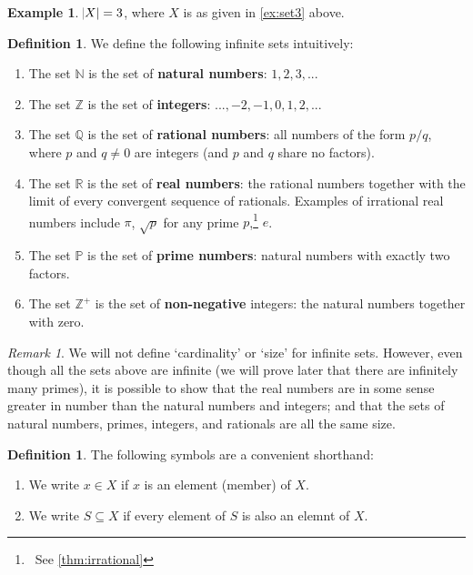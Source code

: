 \documentclass[a4paper]{amsart}
\theoremstyle{definition}
\newtheorem{defn}[thm]{Definition}
\newtheorem{ex}[thm]{Example}
\theoremstyle{remark}
\newtheorem{rem}[thm]{Remark}
\begin{document}
\begin{ex}
  $ \abs{X} = 3 $, where $ X $ is as given in \cref{ex:set3} above.
\end{ex}

\begin{defn}
  We define the following infinite sets intuitively:
  \begin{enumerate}
    \item The set $ \mathbb{N} $ is the set of \textbf{natural numbers}: $ 1, 2, 3, ... $
    \item The set $ \mathbb{Z} $ is the set of \textbf{integers}: $ ..., -2, -1, 0, 1, 2, ... $
    \item The set $ \mathbb{Q} $ is the set of \textbf{rational numbers}: all numbers of the form $ p/q $, where $ p $ and $ q \neq 0 $ are
          integers (and $ p $ and $ q $ share no factors).
    \item The set $ \mathbb{R} $ is the set of \textbf{real numbers}: the rational numbers together with the limit of every convergent
          sequence of rationals. Examples of irrational real numbers include $ \pi $, $ \sqrt{p} $ for any
          prime $ p $,\footnote{~See \cref{thm:irrational}} $ e $.
    \item The set $ \mathbb{P} $ is the set of \textbf{prime numbers}: natural numbers with exactly two factors.
    \item The set $ \mathbb{Z}^+ $ is the set of \textbf{non-negative} integers: the natural numbers together with zero.
  \end{enumerate}
\end{defn}

\begin{rem}
  We will not define `cardinality' or `size' for infinite sets. However, even though all the sets above are infinite (we will prove
  later that there are infinitely many primes), it is possible to show that the real numbers are in some sense greater in number
  than the natural numbers and integers; and that the sets of natural numbers, primes, integers, and rationals are all the same size.
\end{rem}

\begin{defn}
  The following symbols are a convenient shorthand:

  \begin{enumerate}
    \item We write $ x \in X $ if $ x $ is an element (member) of $ X $.
    \item We write $ S \subseteq X $ if every element of $ S $ is also an elemnt of $ X $.
  \end{enumerate}
\end{defn}
\end{document}
